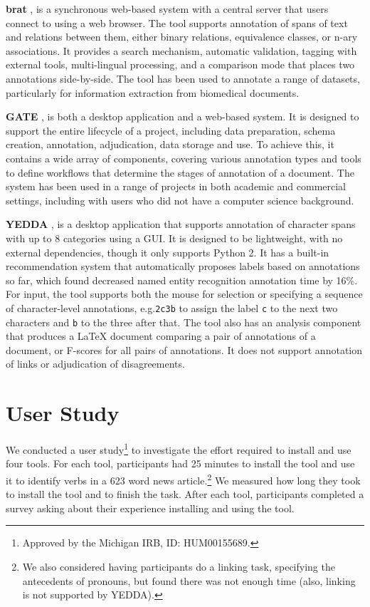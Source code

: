 \documentclass[11pt,a4paper]{article}
\makeatletter
\newcommand{\myeg}{e.g.\@\xspace}
\newcommand{\tightparagraph}[1]{\noindent\textbf{#1}}
\makeatother
\begin{document}
\tightparagraph{brat} \citep{brat}, is a synchronous web-based system with a central server that users connect to using a web browser.
The tool supports annotation of spans of text and relations between them, either binary relations, equivalence classes, or n-ary associations.
It provides a search mechanism, automatic validation, tagging with external tools, multi-lingual processing, and a comparison mode that places two annotations side-by-side.
The tool has been used to annotate a range of datasets, particularly for information extraction from biomedical documents.

\tightparagraph{GATE} \citep{gate}, is both a desktop application and a web-based system.
It is designed to support the entire lifecycle of a project, including data preparation, schema creation, annotation, adjudication, data storage and use.
To achieve this, it contains a wide array of components, covering various annotation types and tools to define workflows that determine the stages of annotation of a document.
The system has been used in a range of projects in both academic and commercial settings, including with users who did not have a computer science background.

\tightparagraph{YEDDA} \citep{yedda}, is a desktop application that supports annotation of character spans with up to 8 categories using a GUI.
It is designed to be lightweight, with no external dependencies, though it only supports Python 2.
It has a built-in recommendation system that automatically proposes labels based on annotations so far, which \citet{yedda} found decreased named entity recognition annotation time by 16\%.
For input, the tool supports both the mouse for selection or specifying a sequence of character-level annotations, \myeg \texttt{2c3b} to assign the label \texttt{c} to the next two characters and \texttt{b} to the three after that.
The tool also has an analysis component that produces a LaTeX document comparing a pair of annotations of a document, or F-scores for all pairs of annotations.
It does not support annotation of links or adjudication of disagreements.

\section{User Study}

We conducted a user study\footnote{
  Approved by the Michigan IRB, ID: HUM00155689.
} to investigate the effort required to install and use four tools.
For each tool, participants had 25 minutes to install the tool and use it to identify verbs in a 623 word news article.\footnote{
  We also considered having participants do a linking task, specifying the antecedents of pronouns, but found there was not enough time (also, linking is not supported by YEDDA).
}
We measured how long they took to install the tool and to finish the task.
After each tool, participants completed a survey asking about their experience installing and using the tool.
\end{document}
